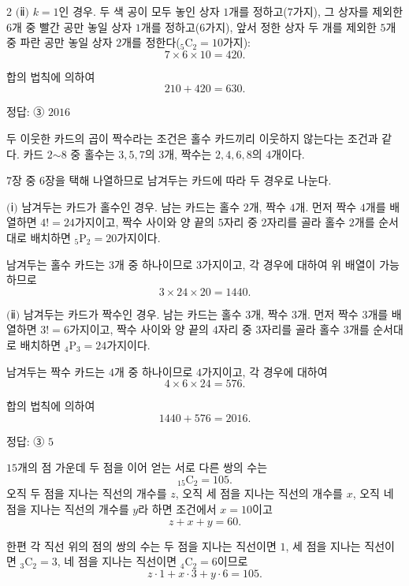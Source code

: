 \documentclass[10pt]{article}
\begin{document}
\begin{multicols}{2}
$(\!$ⅱ$)$ $k = 1$인 경우. 두 색 공이 모두 놓인 상자 $1$개를 정하고($7$가지), 그 상자를 제외한 $6$개 중 빨간 공만 놓일 상자 $1$개를 정하고($6$가지), 앞서 정한 상자 두 개를 제외한 $5$개 중 파란 공만 놓일 상자 $2$개를 정한다(${}_5\mathrm{C}_2 = 10$가지):
\[ 7 \times 6 \times 10 = 420. \]

합의 법칙에 의하여
\[ 210 + 420 = 630. \]

\begin{answerbox}정답: ③ $2016$\end{answerbox}

두 이웃한 카드의 곱이 짝수라는 조건은 홀수 카드끼리 이웃하지 않는다는 조건과 같다. 카드 $2$$\sim$$8$ 중 홀수는 $3, 5, 7$의 $3$개, 짝수는 $2, 4, 6, 8$의 $4$개이다.

$7$장 중 $6$장을 택해 나열하므로 남겨두는 카드에 따라 두 경우로 나눈다.

$(\!$ⅰ$)$ 남겨두는 카드가 홀수인 경우. 남는 카드는 홀수 $2$개, 짝수 $4$개. 먼저 짝수 $4$개를 배열하면 $4! = 24$가지이고, 짝수 사이와 양 끝의 $5$자리 중 $2$자리를 골라 홀수 $2$개를 순서대로 배치하면 ${}_5\mathrm{P}_2 = 20$가지이다.

남겨두는 홀수 카드는 $3$개 중 하나이므로 $3$가지이고, 각 경우에 대하여 위 배열이 가능하므로
\[ 3 \times 24 \times 20 = 1440. \]

$(\!$ⅱ$)$ 남겨두는 카드가 짝수인 경우. 남는 카드는 홀수 $3$개, 짝수 $3$개. 먼저 짝수 $3$개를 배열하면 $3! = 6$가지이고, 짝수 사이와 양 끝의 $4$자리 중 $3$자리를 골라 홀수 $3$개를 순서대로 배치하면 ${}_4\mathrm{P}_3 = 24$가지이다.

남겨두는 짝수 카드는 $4$개 중 하나이므로 $4$가지이고, 각 경우에 대하여
\[ 4 \times 6 \times 24 = 576. \]

합의 법칙에 의하여
\[ 1440 + 576 = 2016. \]

\begin{answerbox}정답: ③ $5$\end{answerbox}

$15$개의 점 가운데 두 점을 이어 얻는 서로 다른 쌍의 수는
\[ {}_{15}\mathrm{C}_2 = 105. \]
오직 두 점을 지나는 직선의 개수를 $z$, 오직 세 점을 지나는 직선의 개수를 $x$, 오직 네 점을 지나는 직선의 개수를 $y$라 하면 조건에서 $x = 10$이고
\[ z + x + y = 60. \]

한편 각 직선 위의 점의 쌍의 수는 두 점을 지나는 직선이면 $1$, 세 점을 지나는 직선이면 ${}_3\mathrm{C}_2 = 3$, 네 점을 지나는 직선이면 ${}_4\mathrm{C}_2 = 6$이므로
\[ z \cdot 1 + x \cdot 3 + y \cdot 6 = 105. \]


\end{multicols}
\end{document}

